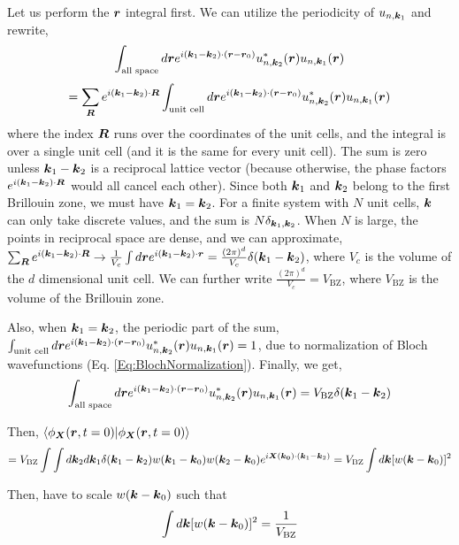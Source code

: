 \documentclass{report}
\renewcommand\vec[1]{\ensuremath\boldsymbol{#1}} %
\begin{document}
Let us perform the $\vec{r}$ integral first. We can utilize the periodicity of $u_{n,\vec{k}_1}$ and rewrite, 
$$\int_{\text{all space}} d\vec{r} e^{i (\vec{k}_1 - \vec{k}_2) \cdot (\vec{r} - \vec{r}_0) }  u^*_{n,\vec{k}_2}(\vec{r}) u_{n,\vec{k}_1}(\vec{r})$$
$$ =  \sum_{ \vec{R}}  e^{i (\vec{k}_1 - \vec{k}_2)\cdot \vec{R} } \int_{\text{unit cell}} d\vec{r} e^{i (\vec{k}_1 - \vec{k}_2) \cdot (\vec{r} - \vec{r}_0) }  u^*_{n,\vec{k}_2}(\vec{r}) u_{n,\vec{k}_1}(\vec{r}) $$
where the index $\vec{R}$ runs over the coordinates of the unit cells, and the integral is over a single unit cell (and it is the same for every unit cell). The sum is zero unless $\vec{k}_1 - \vec{k}_2$ is a reciprocal lattice vector (because otherwise, the phase factors $e^{i (\vec{k}_1 - \vec{k}_2)\cdot \vec{R} }$ would all cancel each other). Since both $\vec{k}_1$ and $\vec{k}_2$ belong to the first Brillouin zone, we must have $\vec{k}_1 = \vec{k}_2$.  For a finite system with $N$ unit cells, $\vec{k}$ can only take discrete values, and the sum is $N \delta_{\vec{k}_1,\vec{k}_2}$. When $N$ is large, the points in reciprocal space are dense, and we can approximate, $\sum_{ \vec{R}}  e^{i (\vec{k}_1 - \vec{k}_2)\cdot \vec{R} } \rightarrow \frac{1}{V_c} \int d \vec{r} e^{i (\vec{k}_1 - \vec{k}_2)\cdot \vec{r} } = \frac{(2 \pi)^d}{V_c} \delta (\vec{k}_1 - \vec{k}_2)$, where $V_c$ is the volume of the $d$ dimensional unit cell. We can further write $\frac{(2 \pi)^d}{V_c} = V_{\text{BZ}}$, where $V_{\text{BZ}}$ is the volume of the Brillouin zone.

Also, when $\vec{k}_1 = \vec{k}_2$, the periodic part of the sum, $\int_{\text{unit cell}} d\vec{r} e^{i (\vec{k}_1 - \vec{k}_2) \cdot (\vec{r} - \vec{r}_0) }  u^*_{n,\vec{k}_2}(\vec{r}) u_{n,\vec{k}_1}(\vec{r}) = 1$, due to normalization of Bloch wavefunctions (Eq. \eqref{Eq:BlochNormalization}). Finally, we get,
$$\int_{\text{all space}} d\vec{r} e^{i (\vec{k}_1 - \vec{k}_2) \cdot (\vec{r} - \vec{r}_0) }  u^*_{n,\vec{k}_2}(\vec{r}) u_{n,\vec{k}_1}(\vec{r}) = V_{\text{BZ}} \delta (\vec{k}_1 - \vec{k}_2) $$

Then, $\bra{\phi_{\vec{X}}(\vec{r}, t=0)}\ket{\phi_{\vec{X}}(\vec{r}, t=0)}$
$$ =  V_{\text{BZ}} \int \int d\vec{k}_2 d\vec{k}_1   \delta (\vec{k}_1 - \vec{k}_2) w(\vec{k}_1 - \vec{k}_0) w(\vec{k}_2 - \vec{k}_0) e^{i \vec{X}(\vec{k_0})\cdot (\vec{k}_1 - \vec{k}_2)} = V_{\text{BZ}} \int d\vec{k} [w(\vec{k} - \vec{k}_0)]^2$$

Then, have to scale $w(\vec{k} - \vec{k}_0)$ such that 
\begin{equation}\label{Eq:WavepacketNormalization}
	\int d\vec{k} [w(\vec{k} - \vec{k}_0)]^2 = \frac{1}{V_\text{BZ}}
\end{equation}
\end{document}
